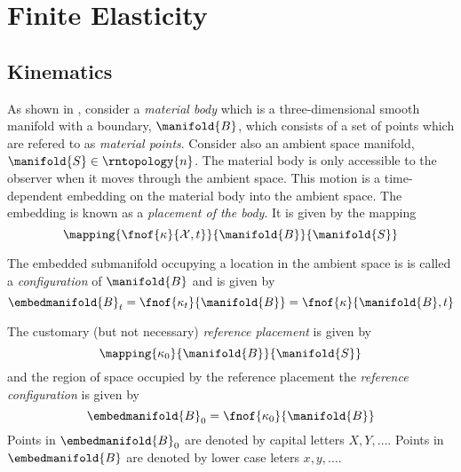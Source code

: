 \section{Finite Elasticity}
\label{sec:FiniteElasticity}


\subsection{Kinematics}

As shown in , consider a \emph{material
  body} which is a three-dimensional smooth manifold with a boundary, $\manifold{B}$,
which consists of a set of points which are refered to as \emph{material
  points}. Consider also an ambient space manifold,
$\manifold{S}\in\rntopology{n}$. The material body is only accessible to
the observer when it moves through the ambient space. This motion is a
time-dependent embedding on the material body into the ambient space. The
embedding is known as a \emph{placement of the body}. It is given by the
mapping
\begin{equation}
  \mapping{\fnof{\kappa}{\mathcal{X},t}}{\manifold{B}}{\manifold{S}}
\end{equation}

The embedded submanifold occupying a location in the ambient space is is
called a \emph{configuration} of $\manifold{B}$ and is given by
\begin{equation}
  \embedmanifold{B}_{t}=\fnof{\kappa_{t}}{\manifold{B}}=\fnof{\kappa}{\manifold{B},t}
\end{equation}

The customary (but not necessary) \emph{reference placement} is given by
\begin{equation}
  \mapping{\kappa_{0}}{\manifold{B}}{\manifold{S}}
\end{equation}
and the region of space occupied by the reference placement \ie the
\emph{reference configuration} is given by
\begin{equation}
  \embedmanifold{B}_{0}=\fnof{\kappa_{0}}{\manifold{B}}
\end{equation}
Points in $\embedmanifold{B}_{0}$ are denoted by capital letters \ie $X, Y,
\ldots$. Points in $\embedmanifold{B}$ are denoted by lower case leters \ie
$x, y, \dots$.


